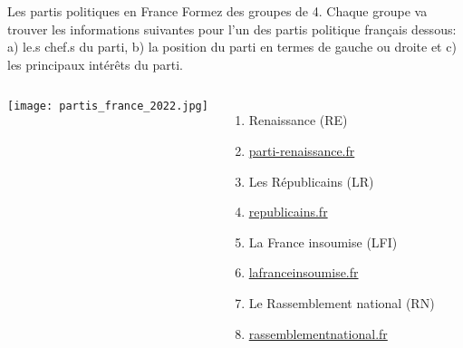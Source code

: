 \begin{frame}{Les partis politiques en France}
  \small
  Formez des groupes de 4.
  Chaque groupe va trouver les informations suivantes pour l'un des partis politique français dessous: a) le.s chef.s du parti, b) la position du parti en termes de gauche ou droite et c) les principaux intérêts du parti.
  \begin{columns}
      \begin{center}
        \texttt{[image: partis\_france\_2022.jpg]}
      \end{center}
      \begin{enumerate}
        \item Renaissance (RE)
        \item[] \href{https://parti-renaissance.fr/}{parti-renaissance.fr}
        \item Les Républicains (LR)
        \item[] \href{https://republicains.fr/}{republicains.fr}
        \item La France insoumise (LFI)
        \item[] \href{https://lafranceinsoumise.fr/}{lafranceinsoumise.fr}
        \item Le Rassemblement national (RN)
        \item[] \href{https://rassemblementnational.fr/}{rassemblementnational.fr}
      \end{enumerate}
  \end{columns}
\end{frame}
